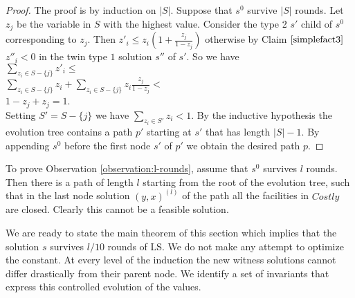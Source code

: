 \documentclass[11pt]{article}\usepackage{amsmath}
\begin{document}
\begin{proof}
The proof is by induction on $|S|$.
Suppose that $s^0$ survive $|S|$ rounds. Let $z_{j}$ be the variable in  $S$ with
the highest value. Consider the type 2 $s'$ child of $s^{0}$ corresponding to $z_{j}$.
Then $z'_{i} \leq z_{i}(1+\frac{z_j}{1-z_j})$ otherwise by Claim
$\ref{simplefact3}$ 
$z''_i< 0$ in the twin type $1$ solution
$s''$ of $s'.$ So we have \\
$\sum_{z_i \in S-\{j\}}z'_{i} \leq $\\
$\sum_{z_i \in S-\{j\}}z_i+\sum_{z_i \in S-\{j\}}z_i\frac{z_j}{1-z_j} <$\\
$1-z_j + z_j =1$.\\

\noindent
Setting $S'=S-\{j\}$ we have $\sum_{z_i \in S'}z_i< 1.$ By the  inductive hypothesis
the evolution tree contains a  path $p'$ starting at $s'$ that has 
length $|S|-1.$  By appending  $s^{0}$ before the first node $s'$ of $p'$
we obtain the desired path $p$.
\end{proof}



To prove Observation \ref{observation:l-rounds}, assume that $s^0$ survives $l$ rounds.
Then there is a path of length $l$ starting from the root of the evolution tree,
such that in  the last
node solution $(y,x)^{(l)}$ of the path all the facilities in 
$Costly$ are closed. Clearly this cannot
be a feasible solution.


\noindent 
We are ready to state the main theorem of this section 
which implies that the solution $s$  survives $l/10$ 
 rounds of LS. We  do not make any attempt to optimize the   constant.
At every level of the induction the new witness solutions cannot
differ drastically from  their parent node. 
We identify a  set of invariants that express this controlled
evolution of the values. 
\end{document}
